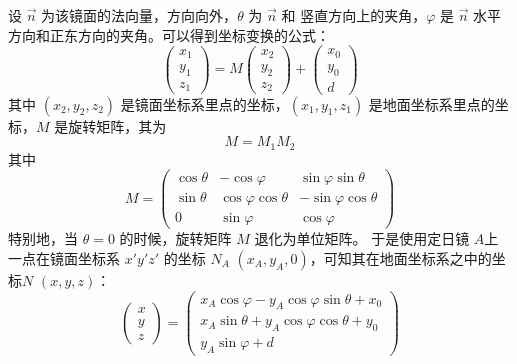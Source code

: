 \documentclass[../main.tex]{subfiles}
\begin{document}
设 \(\vec n\) 为该镜面的法向量，方向向外，\(\theta\) 为 \(\vec n\) 和 竖直方向上的夹角，\(\varphi\) 是 \(\vec n\) 水平方向和正东方向的夹角。可以得到坐标变换的公式：
\begin{equation}
\begin{pmatrix}
x_{1}\\
y_1\\
z_1
\end{pmatrix}
= M
\begin{pmatrix}
x_2\\
y_2\\
z_2
\end{pmatrix} +
\begin{pmatrix}
x_0\\
y_0\\
d
\end{pmatrix}
\end{equation}
其中 \((x_2,y_2,z_2)\) 是镜面坐标系里点的坐标，\((x_1,y_1,z_1)\) 是地面坐标系里点的坐标，\(M\) 是旋转矩阵，其为
\[
M  = M_1 M_2
\]
其中
\begin{equation}\label{equ:transM}
M =
\begin{pmatrix}
\cos \theta & - \cos \varphi & \sin \varphi \sin \theta\\
\sin \theta & \cos \varphi \cos \theta & - \sin \varphi \cos \theta\\
0 & \sin \varphi & \cos \varphi
\end{pmatrix}
\end{equation}
特别地，当 \(\theta = 0\) 的时候，旋转矩阵 \(M\) 退化为单位矩阵。
于是使用定日镜 \(A\)上一点在镜面坐标系 \(x'y'z'\) 的坐标 \(N_{A}\) \((x_{A}, y_{A},0)\)，可知其在地面坐标系之中的坐标\(N\) \((x, y , z)\)：
\begin{equation}
\begin{pmatrix}
x\\
y\\
z
\end{pmatrix}
=
\begin{pmatrix}
x_{A} \cos \varphi - y_{A} \cos \varphi \sin \theta + x_0\\
x_{A} \sin \theta + y_{A} \cos \varphi \cos \theta + y_{0} \\
y_{A} \sin \varphi + d
\end{pmatrix}
\end{equation}
\end{document}
